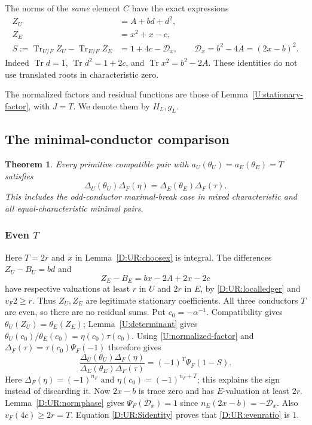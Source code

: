 \documentclass[11pt]{amsart}
\newtheorem{theorem}{Theorem}[section]
\theoremstyle{definition}
\theoremstyle{remark}
\newcommand{\Tr}{\operatorname{Tr}}
\begin{document}
The norms of the \emph{same} element $C$ have the exact expressions
\begin{align}
 Z_U&=A+b d+d^2,\label{D:UR:ZU}\\
 Z_E&=x^2+x-c,\label{D:UR:ZE}\\
 S:=\Tr_{U/F}Z_U-\Tr_{E/F}Z_E
     &=1+4c-\mathcal D_x,\qquad
       \mathcal D_x=b^2-4A=(2x-b)^2.\label{D:UR:Sidentity}
\end{align}
Indeed $\Tr d=1$, $\Tr d^2=1+2c$, and $\Tr x^2=b^2-2A$.
These identities do not use translated roots in characteristic zero.

The normalized factors and residual functions are those of
Lemma~\ref{U:stationary-factor}, with $J=T$. We denote them by $H_L,g_L$.

\subsection{The minimal-conductor comparison}
\begin{theorem}\label{D:UR:minimal}
Every primitive compatible pair with
$a_U(\theta_U)=a_E(\theta_E)=T$ satisfies
\begin{equation}\label{D:UR:URtarget}
 \Delta_U(\theta_U)\Delta_F(\eta)
 =\Delta_E(\theta_E)\Delta_F(\tau).
\end{equation}
This includes the odd-conductor maximal-break case in mixed characteristic
and all equal-characteristic minimal pairs.
\end{theorem}

\subsubsection*{Even \texorpdfstring{$T$}{T}}
Here $T=2r$ and $x$ in Lemma~\ref{D:UR:choosex} is integral. The differences
$Z_U-B_U=bd$ and
\[
 Z_E-B_E=bx-2A+2x-2c
\]
have respective valuations at least $r$ in $U$ and $2r$ in $E$, by
\eqref{D:UR:localledger} and $v_F2\ge r$. Thus $Z_U,Z_E$ are legitimate
stationary coefficients. All three conductors $T$ are even, so there are
no residual sums.
Put $c_0=-\alpha^{-1}$. Compatibility gives
$\theta_U(Z_U)=\theta_E(Z_E)$; Lemma~\ref{U:determinant} gives
$\theta_U(c_0)/\theta_E(c_0)=\eta(c_0)\tau(c_0)$.
Using \eqref{U:normalized-factor} and
$\Delta_F(\tau)=\tau(c_0)\Psi_F(-1)$ therefore gives
\begin{equation}\label{D:UR:evenratio}
 \frac{\Delta_U(\theta_U)\Delta_F(\eta)}
      {\Delta_E(\theta_E)\Delta_F(\tau)}
 =(-1)^T\Psi_F(1-S).
\end{equation}
Here $\Delta_F(\eta)=(-1)^{n_F}$ and
$\eta(c_0)=(-1)^{n_F+T}$; this explains the sign instead of discarding it.
Now $2x-b$ is trace zero and has $E$-valuation at least $2r$.
Lemma~\ref{D:UR:normphase} gives $\Psi_F(\mathcal D_x)=1$ since
$n_E(2x-b)=-\mathcal D_x$. Also $v_F(4c)\ge2r=T$.
Equation \eqref{D:UR:Sidentity} proves that \eqref{D:UR:evenratio} is $1$.
\end{document}
